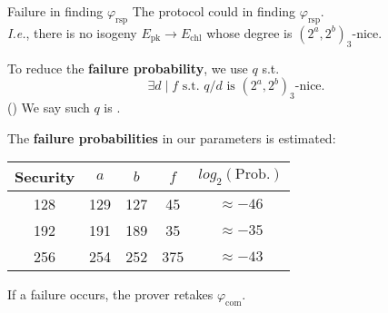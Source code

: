 \begin{frame}{Failure in finding $\varphi_\mathrm{rsp}$}
    The protocol could  in finding $\varphi_\mathrm{rsp}$.\\[3pt]
    \textit{I.e.}, there is no isogeny $E_\mathrm{pk} \to E_\mathrm{chl}$ whose degree is $(2^a, 2^b)_3$-nice.

    \mypause
    \vspace{10pt}
    To reduce the \textbf{failure probability}, we use $q$ s.t.
    $$
        \exists d \mid f \text{ s.t. } q/d \text{ is $(2^a, 2^b)_3$-nice}.
    $$
    ()
    We say such $q$ is .

    \mypause
    \vspace{10pt}
    The \textbf{failure probabilities} in our parameters is estimated:
    \begin{table}
        \begin{center}
            \begin{tabular}{c|c|c|c|c}
                Security & $a$ & $b$ & $f$ & $log_2(\text{Prob.})$ \\
                \hline
                128 & 129 & 127 & 45 & $\approx -46$ \\
                192 & 191 & 189 & 35 & $\approx -35$ \\
                256 & 254 & 252 & 375 & $\approx -43$
            \end{tabular}
        \end{center}
    \end{table}
    If a failure occurs, the prover retakes $\varphi_{\mathrm{com}}$.
\end{frame}

